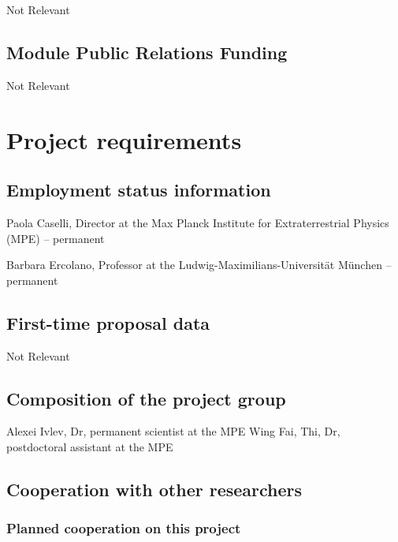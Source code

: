 \documentclass[10pt,fleqn,twoside]{article}
\newcommand{\Tcol}{\color{blue}}
\begin{document}
Not Relevant

\subsection{\Tcol Module Public Relations Funding}

Not Relevant

\section{\Tcol Project requirements}
\renewcommand{\leftmark}{\sc Project requirements}

\subsection{\Tcol Employment status information}

Paola Caselli, Director at the Max Planck Institute for Extraterrestrial Physics (MPE) -- permanent 

Barbara Ercolano, Professor at the Ludwig-Maximilians-Universit\"at
M\"unchen -- permanent

\subsection{\Tcol First-time proposal data}

Not Relevant

\subsection{\Tcol Composition of the project group}

Alexei Ivlev, Dr, permanent scientist at the MPE 
Wing Fai, Thi, Dr, postdoctoral assistant at the MPE

\subsection{\Tcol Cooperation with other researchers}

\subsubsection{\Tcol Planned cooperation on this project}
\end{document}
